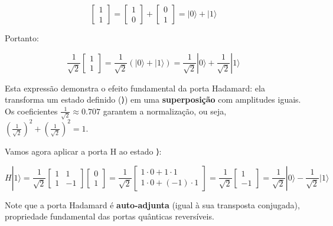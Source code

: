 \documentclass[
  brazilian,
]{report}
\begin{document}
\[\begin{bmatrix} 1 \\ 1 \end{bmatrix} = \begin{bmatrix} 1 \\ 0 \end{bmatrix} + \begin{bmatrix} 0 \\ 1 \end{bmatrix} = |0⟩ + |1⟩\]

Portanto:

\[\frac{1}{\sqrt{2}} \begin{bmatrix} 1 \\ 1 \end{bmatrix} = \frac{1}{\sqrt{2}} (|0⟩ + |1⟩) = \frac{1}{\sqrt{2}}|0⟩ + \frac{1}{\sqrt{2}}|1⟩\]

Esta expressão demonstra o efeito fundamental da porta Hadamard: ela
transforma um estado definido (⟩) em uma \textbf{superposição}
com amplitudes iguais. Os coeficientes
\(\frac{1}{\sqrt{2}} \approx 0.707\) garantem a normalização, ou seja,
\(\left(\frac{1}{\sqrt{2}}\right)^2 + \left(\frac{1}{\sqrt{2}}\right)^2 = 1\).

Vamos agora aplicar a porta H ao estado ⟩:

\[H|1⟩ = \frac{1}{\sqrt{2}} \begin{bmatrix} 1 & 1 \\ 1 & -1 \end{bmatrix} \begin{bmatrix} 0 \\ 1 \end{bmatrix} = \frac{1}{\sqrt{2}} \begin{bmatrix} 1 \cdot 0 + 1 \cdot 1 \\ 1 \cdot 0 + (-1) \cdot 1 \end{bmatrix} = \frac{1}{\sqrt{2}} \begin{bmatrix} 1 \\ -1 \end{bmatrix} = \frac{1}{\sqrt{2}}|0⟩ - \frac{1}{\sqrt{2}}|1⟩\]

Note que a porta Hadamard é \textbf{auto-adjunta} (igual à sua
transposta conjugada), propriedade fundamental das portas quânticas
reversíveis.
\end{document}
